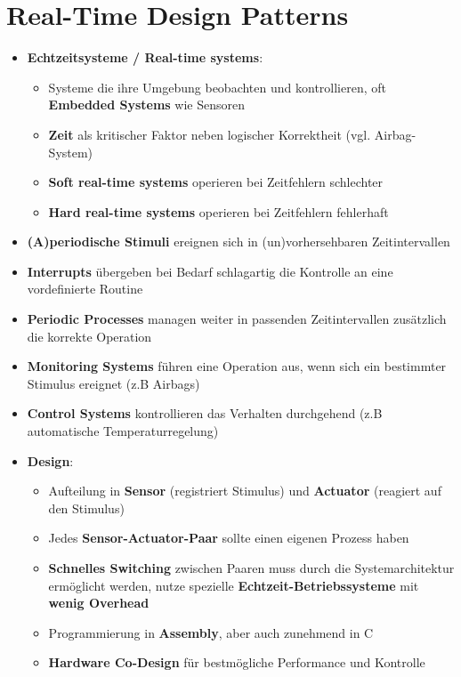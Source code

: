 \section{Real-Time Design Patterns}
\label{rtdp:sec:real_time_design_patterns}

\begin{itemize}
	\item \textbf{Echtzeitsysteme / Real-time systems}:
	\begin{itemize}
		\item Systeme die ihre Umgebung beobachten und kontrollieren, oft \textbf{Embedded Systems} wie Sensoren
		\item \textbf{Zeit} als kritischer Faktor neben logischer Korrektheit (vgl. Airbag-System)
		\item \textbf{Soft real-time systems} operieren bei Zeitfehlern schlechter
		\item \textbf{Hard real-time systems} operieren bei Zeitfehlern fehlerhaft
	\end{itemize}
	\item \textbf{(A)periodische Stimuli} ereignen sich in (un)vorhersehbaren Zeitintervallen
	\item \textbf{Interrupts} übergeben bei Bedarf schlagartig die Kontrolle an eine vordefinierte Routine
	\item \textbf{Periodic Processes} managen weiter in passenden Zeitintervallen zusätzlich die korrekte Operation
	\item \textbf{Monitoring Systems} führen eine Operation aus, wenn sich ein bestimmter Stimulus ereignet (z.B Airbags)
	\item \textbf{Control Systems} kontrollieren das Verhalten durchgehend (z.B automatische Temperaturregelung)
	\item \textbf{Design}:
	\begin{itemize}
		\item Aufteilung in \textbf{Sensor} (registriert Stimulus) und \textbf{Actuator} (reagiert auf den Stimulus)
		\item Jedes \textbf{Sensor-Actuator-Paar} sollte einen eigenen Prozess haben
		\item \textbf{Schnelles Switching} zwischen Paaren muss durch die Systemarchitektur ermöglicht werden, nutze spezielle \textbf{Echtzeit-Betriebssysteme} mit \textbf{wenig Overhead}
		\item Programmierung in \textbf{Assembly}, aber auch zunehmend in C
		\item \textbf{Hardware Co-Design} für bestmögliche Performance und Kontrolle
	\end{itemize}
\end{itemize}

